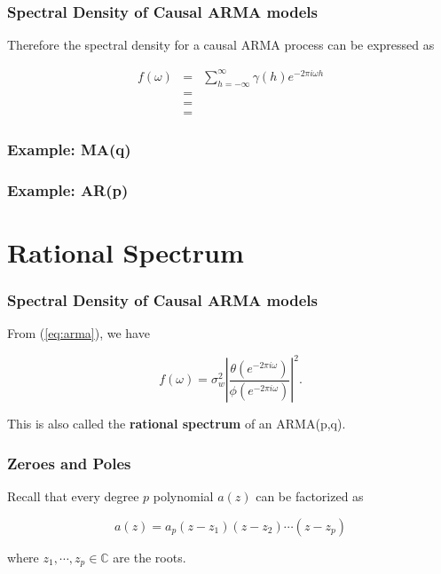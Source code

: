 \documentclass[%
xcolor=pdftex]{beamer}
\begin{document}
\begin{frame}
\frametitle{Spectral Density of Causal ARMA models}

Therefore the spectral density for a causal ARMA process can be expressed as

\begin{eqnarray} \label{eq:arma}
f(\omega) &=& \sum_{h=-\infty}^{\infty} \gamma(h) e^{-2 \pi i \omega h} \nonumber \\
          &=& \nonumber \\
          &=& \nonumber \\
          &=&
\end{eqnarray}

\end{frame}

\begin{frame}
\frametitle{Example: MA(q)}


\end{frame}

\begin{frame}
\frametitle{Example: AR(p)}


\end{frame}

\section{Rational Spectrum}
\frame{\tableofcontents[currentsection]}

\begin{frame}
\frametitle{Spectral Density of Causal ARMA models}


From (\ref{eq:arma}), we have

\begin{equation*} 
f(\omega) = \sigma_w^2 \left \lvert \frac{\theta(e^{-2 \pi i \omega})}{\phi(e^{-2 \pi i \omega})} \right \rvert ^2.
\end{equation*}

This is also called the \textbf{rational spectrum} of an ARMA(p,q).


\end{frame}

\begin{frame}
\frametitle{Zeroes and Poles}

Recall that every degree $p$ polynomial $a(z)$ can be factorized as

$$
a(z) = a_p(z-z_1)(z-z_2)\cdots(z-z_p)
$$

where $z_1, \cdots, z_p \in \mathbb{C}$ are the roots.

\end{frame}
\end{document}
